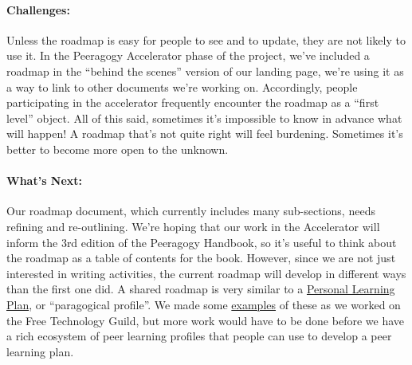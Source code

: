 \paragraph{Challenges:} Unless the roadmap is easy for people to see and to
update, they are not likely to use it. In the Peeragogy Accelerator
phase of the project, we've included a roadmap in the ``behind the
scenes'' version of our landing page, we're using it as a way to link to
other documents we're working on. Accordingly, people participating in
the accelerator frequently encounter the roadmap as a ``first level''
object. All of this said, sometimes it's impossible to know in advance
what will happen! A roadmap that's not quite right will feel burdening.
Sometimes it's better to become more open to the unknown.

\paragraph{What's Next:} Our roadmap document, which currently includes
many sub-sections, needs refining and re-outlining. We're hoping that
our work in the Accelerator will inform the 3rd edition of the Peeragogy
Handbook, so it's useful to think about the roadmap as a table of
contents for the book. However, since we are not just interested in
writing activities, the current roadmap will develop in different ways
than the first one did. A shared roadmap is very similar to
a \href{http://peeragogy.org/to-peeragogy/personal-learning-plan/}{Personal
Learning Plan}, or ``paragogical profile''. We made
some \href{http://campus.ftacademy.org/wiki/index.php/Free_Technology_Guild\#Learning_design}{examples}
of these as we worked on the Free Technology Guild, but more work would
have to be done before we have a rich ecosystem of peer learning
profiles that people can use to develop a peer learning plan.
